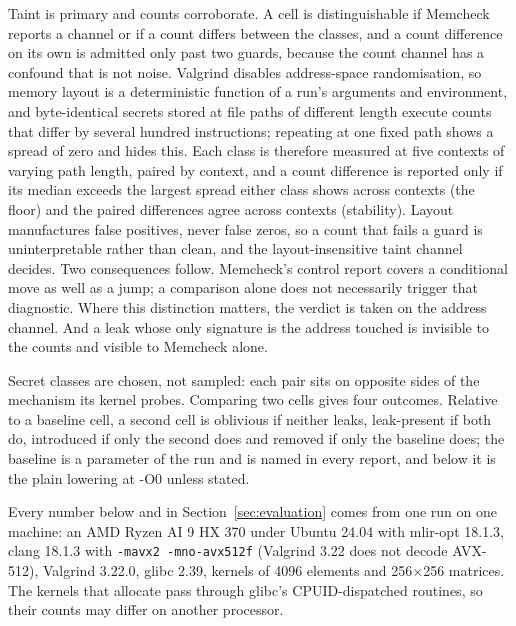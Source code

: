 Taint is primary and counts corroborate. A cell is distinguishable if Memcheck reports a channel or if a count differs between the classes, and a count difference on its own is admitted only past two guards, because the count channel has a confound that is not noise. Valgrind disables address-space randomisation, so memory layout is a deterministic function of a run's arguments and environment, and byte-identical secrets stored at file paths of different length execute counts that differ by several hundred instructions; repeating at one fixed path shows a spread of zero and hides this. Each class is therefore measured at five contexts of varying path length, paired by context, and a count difference is reported only if its median exceeds the largest spread either class shows across contexts (the floor) and the paired differences agree across contexts (stability). Layout manufactures false positives, never false zeros, so a count that fails a guard is uninterpretable rather than clean, and the layout-insensitive taint channel decides. Two consequences follow. Memcheck's control report covers a conditional move as well as a jump; a comparison alone does not necessarily trigger that diagnostic. Where this distinction matters, the verdict is taken on the address channel. And a leak whose only signature is the address touched is invisible to the counts and visible to Memcheck alone.

Secret classes are chosen, not sampled: each pair sits on opposite sides of the mechanism its kernel probes. Comparing two cells gives four outcomes. Relative to a baseline cell, a second cell is oblivious if neither leaks, leak-present if both do, introduced if only the second does and removed if only the baseline does; the baseline is a parameter of the run and is named in every report, and below it is the plain lowering at -O0 unless stated.

Every number below and in Section~\ref{sec:evaluation} comes from one run on one machine: an AMD Ryzen AI 9 HX 370 under Ubuntu 24.04 with mlir-opt 18.1.3, clang 18.1.3 with \texttt{-mavx2 -mno-avx512f} (Valgrind 3.22 does not decode AVX-512), Valgrind 3.22.0, glibc 2.39, kernels of 4096 elements and 256×256 matrices. The kernels that allocate pass through glibc's CPUID-dispatched routines, so their counts may differ on another processor.

